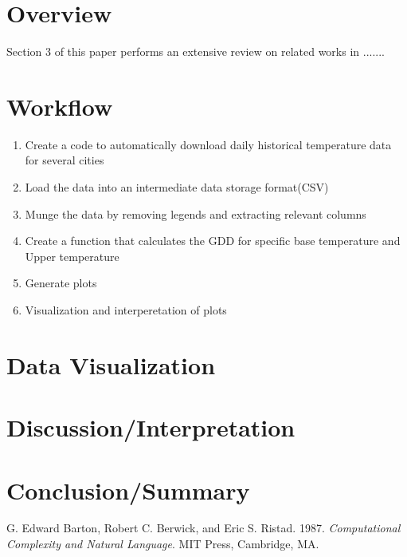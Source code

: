 \documentclass[12pt]{article}
\begin{document}
\noindent
\section{ \bf Overview}
Section 3 of this paper performs an extensive review on related works in .......


\section{\bf Workflow}

\begin{enumerate}
\item Create a code to automatically download daily historical temperature data for several cities
\item Load the data into an intermediate data storage format(CSV)
\item Munge the data by removing legends and extracting relevant columns
\item Create a function that calculates the GDD for specific base temperature and Upper temperature
\item Generate plots
\item Visualization and interperetation of plots
\end{enumerate}


\section{ \bf Data Visualization}


\section{Discussion/Interpretation}



\section{Conclusion/Summary}



\begin{thebibliography}{99}

G. Edward Barton, Robert C. Berwick, and Eric S. Ristad. 1987. 
{\em Computational Complexity and Natural Language}. MIT Press, Cambridge, 
MA.


\end{thebibliography}
\end{document}
